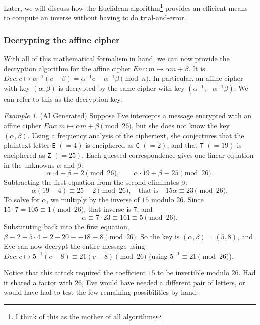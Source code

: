 \documentclass{article}
\theoremstyle{plain}
\theoremstyle{definition}
\theoremstyle{remark}
\newtheorem{example}[theorem]{Example}
\numberwithin{theorem}{section}
\begin{document}
Later, we will discuss how the Euclidean algorithm\footnote{I think of this as the mother of all algorithms} provides an efficient means to compute an inverse without having to do trial-and-error.

\subsubsection{Decrypting the affine cipher}

With all of this mathematical formalism in hand, we can now provide the decryption algorithm for the affine cipher $Enc: m \mapsto \alpha m + \beta$.  It is $Dec: c \mapsto \alpha^{-1}(c-\beta) = \alpha^{-1} c - \alpha^{-1}\beta \pmod n$.  In particular, an affine cipher with key $(\alpha, \beta)$ is decrypted by the same cipher with key $(\alpha^{-1}, -\alpha^{-1}\beta)$.  We can refer to this as the decryption key.

\begin{example}
  (AI Generated) Suppose Eve intercepts a message encrypted with an affine cipher $Enc: m \mapsto \alpha m + \beta \pmod{26}$, but she does not know the key $(\alpha, \beta)$.  Using a frequency analysis of the ciphertext, she conjectures that the plaintext letter \texttt{E} $(=4)$ is enciphered as \texttt{C} $(=2)$, and that \texttt{T} $(=19)$ is enciphered as \texttt{Z} $(=25)$.  Each guessed correspondence gives one linear equation in the unknowns $\alpha$ and $\beta$:
\[
\alpha \cdot 4 + \beta \equiv 2 \pmod{26}, \qquad \alpha \cdot 19 + \beta \equiv 25 \pmod{26}.
\]
Subtracting the first equation from the second eliminates $\beta$:
\[
\alpha(19 - 4) \equiv 25 - 2 \pmod{26}, \quad \text{that is} \quad 15\alpha \equiv 23 \pmod{26}.
\]
To solve for $\alpha$, we multiply by the inverse of $15$ modulo $26$.  Since $15 \cdot 7 = 105 \equiv 1 \pmod{26}$, that inverse is $7$, and
\[
\alpha \equiv 7 \cdot 23 \equiv 161 \equiv 5 \pmod{26}.
\]
Substituting back into the first equation, $\beta \equiv 2 - 5 \cdot 4 \equiv 2 - 20 \equiv -18 \equiv 8 \pmod{26}$.  So the key is $(\alpha, \beta) = (5, 8)$, and Eve can now decrypt the entire message using $Dec: c \mapsto 5^{-1}(c - 8) \equiv 21(c-8) \pmod{26}$ (using $5^{-1} \equiv 21 \pmod{26}$).

Notice that this attack required the coefficient $15$ to be invertible modulo $26$.  Had it shared a factor with $26$, Eve would have needed a different pair of letters, or would have had to test the few remaining possibilities by hand.
\end{example}
\end{document}

